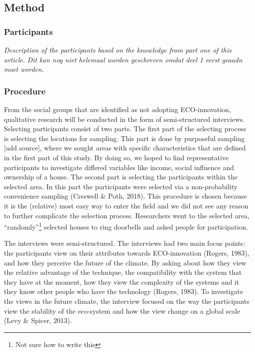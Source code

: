 \documentclass[man,floatsintext]{apa6}
\let\rmarkdownfootnote\footnote%
\def\footnote{\protect\rmarkdownfootnote}
\begin{document}
\subsection{Method}\label{method-1}

\subsubsection{Participants}\label{participants}

\emph{Description of the participants based on the knowledge from part
one of this article. Dit kan nog niet helemaal worden geschreven omdat
deel 1 eerst geaadn moet worden.}

\subsubsection{Procedure}\label{procedure-1}

From the social groups that are identified as not adopting
ECO-innovation, qualitative research will be conducted in the form of
semi-structured interviews. Selecting participants consist of two parts.
The first part of the selecting process is selecting the locations for
sampling. This part is done by purposeful sampling {[}add source{]},
where we sought areas with specific characteristics that are defined in
the first part of this study. By doing so, we hoped to find
representative participants to investigate differed variables like
income, social influence and ownership of a house. The second part is
selecting the participants within the selected area. In this part the
participants were selected via a non-probability convenience sampling
(Creswell \& Poth, 2018). This procedure is chosen because it is the
(relative) most easy way to enter the field and we did not see any
reason to further complicate the selection process. Researchers went to
the selected area, \enquote{randomly}\footnote{Not sure how to write
  this} selected houses to ring doorbells and asked people for
participation.

The interviews were semi-structured. The interviews had two main focus
points: the participants view on their attributes towards ECO-innovation
(Rogers, 1983), and how they perceive the future of the climate. By
asking about how they view the relative advantage of the technique, the
compatibility with the system that they have at the moment, how they
view the complexity of the systems and it they know other people who
have the technology (Rogers, 1983). To investigate the views in the
future climate, the interview focused on the way the participants view
the stability of the eco-system and how the view change on a global
scale (Levy \& Spicer, 2013).
\end{document}
